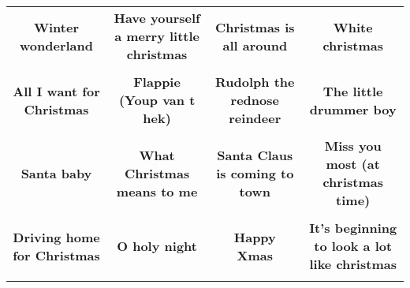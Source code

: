 \documentclass[12pt]{article} \usepackage{eso-pic, graphicx}
\newcommand{\background}[1]{%
\AddToShipoutPictureBG*{\texttt{[image: \#1]}}
}
\begin{document}
\tabcolsep=30.2pt \renewcommand{\arraystretch}{4.5}   \vspace*{4.3cm} \begin{center}  \begin{tabular}{c c c c}
\parbox{3cm}{\centering \textbf{Winter wonderland}}& 
\parbox{3cm}{\centering \textbf{Have yourself a merry little christmas}}& 
\parbox{3cm}{\centering \textbf{Christmas is all around}}& 
\parbox{3cm}{\centering \textbf{White christmas}}\\ \\ 
\parbox{3cm}{\centering \textbf{All I want for Christmas}}& 
\parbox{3cm}{\centering \textbf{Flappie (Youp van t hek)}}& 
\parbox{3cm}{\centering \textbf{Rudolph the rednose reindeer}}& 
\parbox{3cm}{\centering \textbf{The little drummer boy}}\\ \\ 
\parbox{3cm}{\centering \textbf{Santa baby}}& 
\parbox{3cm}{\centering \textbf{What Christmas means to me}}& 
\parbox{3cm}{\centering \textbf{Santa Claus is coming to town}}& 
\parbox{3cm}{\centering \textbf{Miss you most (at christmas time)}}\\ \\ 
\parbox{3cm}{\centering \textbf{Driving home for Christmas}}& 
\parbox{3cm}{\centering \textbf{O holy night}}& 
\parbox{3cm}{\centering \textbf{Happy Xmas}}& 
\parbox{3cm}{\centering \textbf{It’s beginning to look a lot like christmas}}\\ \\ 
\end{tabular} \background{discobingo.pdf} \end{center} 
\end{document}
